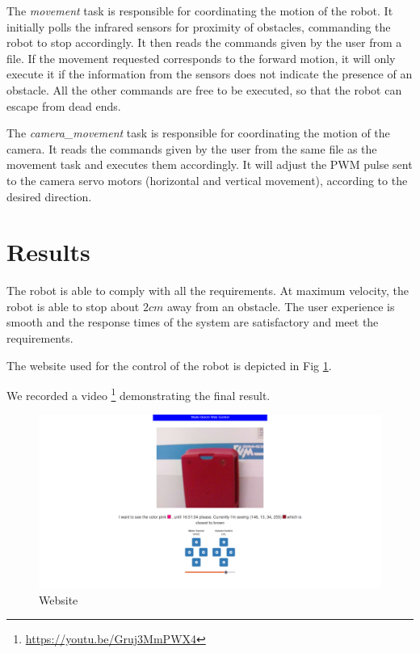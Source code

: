 \documentclass[conference]{IEEEtran}
\begin{document}
The \textit{movement} task is responsible for coordinating the motion of the robot. It initially polls the infrared sensors for proximity of obstacles, commanding the robot to stop accordingly. It then reads the commands given by the user from a file. If the movement requested corresponds to the forward motion, it will only execute it if the information from the sensors does not indicate the presence of an obstacle. All the other commands are free to be executed, so that the robot can escape from dead ends.

The \textit{camera\_movement} task is responsible for coordinating the motion of the camera. It reads the commands given by the user from the same file as the movement task and executes them accordingly. It will adjust the PWM pulse sent to the camera servo motors (horizontal and vertical movement), according to the desired direction.

\section{Results}

The robot is able to comply with all the requirements. At maximum velocity, the robot is able to stop about $2cm$ away from an obstacle. The user experience is smooth and the response times of the system are satisfactory and meet the requirements. 

The website used for the control of the robot is depicted in Fig \ref{fig:website}.

We recorded a video \footnote{\url{https://youtu.be/Gruj3MmPWX4}} demonstrating the final result.

\begin{figure}
    \centering
    \includegraphics[width=\linewidth]{img/website.png}
    \caption{Website}
    \label{fig:website}
\end{figure}
\end{document}
